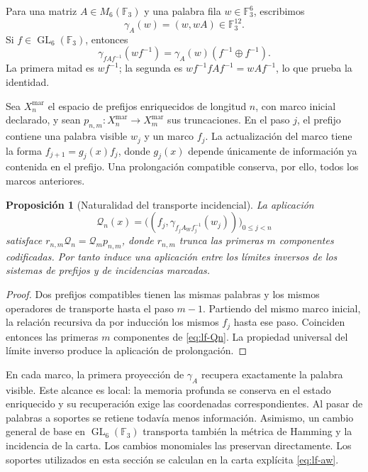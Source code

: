 \documentclass[a4paper,10pt]{article}
\newtheorem{proposition}[theorem]{Proposición}
\theoremstyle{definition}\newtheorem{definition}[theorem]{Definición}
\theoremstyle{remark}\newtheorem{remark}[theorem]{Observación}
\numberwithin{equation}{section}
\begin{document}
Para una matriz \(A\in M_6(\mathbb F_3)\) y una palabra fila
\(w\in\mathbb F_3^6\), escribimos
\[
 \gamma_A(w)=(w,wA)\in\mathbb F_3^{12}.
\]
Si \(f\in\operatorname{GL}_6(\mathbb F_3)\), entonces
\begin{equation}
 \gamma_{fAf^{-1}}(wf^{-1})
   =\gamma_A(w)(f^{-1}\oplus f^{-1}).
 \label{eq:lf-frame-covariance}
\end{equation}
La primera mitad es \(wf^{-1}\); la segunda es
\(wf^{-1}fAf^{-1}=wAf^{-1}\), lo que prueba la identidad.

Sea \(X_n^{\mathrm{mar}}\) el espacio de prefijos enriquecidos de
longitud \(n\), con marco inicial declarado, y sean
\(p_{n,m}:X_n^{\mathrm{mar}}\to X_m^{\mathrm{mar}}\) sus
truncaciones. En el paso \(j\), el prefijo contiene una palabra
visible \(w_j\) y un marco \(f_j\). La actualización del marco
tiene la forma \(f_{j+1}=g_j(x)f_j\), donde \(g_j(x)\) depende
únicamente de información ya contenida en el prefijo. Una
prolongación compatible conserva, por ello, todos los marcos
anteriores.

\begin{proposition}[Naturalidad del transporte incidencial]
\label{prop:lf-incidence-naturality}
La aplicación
\begin{equation}
 \mathcal Q_n(x)=
 \bigl((f_j,\gamma_{f_jA_Wf_j^{-1}}(w_j))\bigr)_{0\leq j<n}
 \label{eq:lf-Qn}
\end{equation}
satisface \(r_{n,m}\mathcal Q_n=\mathcal Q_mp_{n,m}\), donde \(r_{n,m}\) trunca
las primeras \(m\) componentes codificadas. Por tanto induce una
aplicación entre los límites inversos de los sistemas de
prefijos y de incidencias marcadas.
\end{proposition}
\begin{proof}
Dos prefijos compatibles tienen las mismas palabras y los mismos
operadores de transporte hasta el paso \(m-1\). Partiendo del
mismo marco inicial, la relación recursiva da por inducción los
mismos \(f_j\) hasta ese paso. Coinciden entonces las primeras
\(m\) componentes de \eqref{eq:lf-Qn}. La propiedad universal
del límite inverso produce la aplicación de prolongación.
\end{proof}

En cada marco, la primera proyección de \(\gamma_A\) recupera
exactamente la palabra visible. Este alcance es local: la
memoria profunda se conserva en el estado enriquecido y su
recuperación exige las coordenadas correspondientes. Al pasar
de palabras a soportes se retiene todavía menos información.
Asimismo, un cambio general de base en
\(\operatorname{GL}_6(\mathbb F_3)\) transporta también la métrica
de Hamming y la incidencia de la carta. Los cambios monomiales
las preservan directamente. Los soportes utilizados en esta
sección se calculan en la carta explícita \eqref{eq:lf-aw}.
\end{document}
